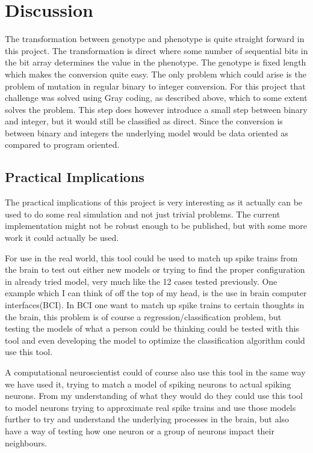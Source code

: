 \section{Discussion}\label{sec:discussion}
The transformation between genotype and phenotype is quite straight forward in
this project. The transformation is direct where some number of sequential bits in the bit
array determines the value in the phenotype. The genotype is fixed length which
makes the conversion quite easy. The only problem which could arise is the
problem of mutation in regular binary to integer conversion. For this project
that challenge was solved using Gray coding, as described above, which to some
extent solves the problem. This step does however introduce a small step between
binary and integer, but it would still be classified as direct. Since the
conversion is between binary and integers the underlying model would be
data oriented as compared to program oriented.

\subsection{Practical Implications}\label{sec:practical-implications}
The practical implications of this project is very interesting as it actually
can be used to do some real simulation and not just trivial problems. The
current implementation might not be robust enough to be published, but with some
more work it could actually be used.

For use in the real world, this tool could be used to match up spike trains from
the brain to test out either new models or trying to find the proper
configuration in already tried model, very much like the 12 cases tested
previously. One example which I can think of off the top of my head, is the use
in brain computer interfaces(BCI). In BCI one want to match up spike trains to
certain thoughts in the brain, this problem is of course a
regression/classification problem, but testing the models of what a person could
be thinking could be tested with this tool and even developing the model to
optimize the classification algorithm could use this tool.

A computational neuroscientist could of course also use this tool in the same
way we have used it, trying to match a model of spiking neurons to actual
spiking neurons. From my understanding of what they would do they could use this
tool to model neurons trying to approximate real spike trains and use those
models further to try and understand the underlying processes in the brain, but
also have a way of testing how one neuron or a group of neurons impact their
neighbours.

